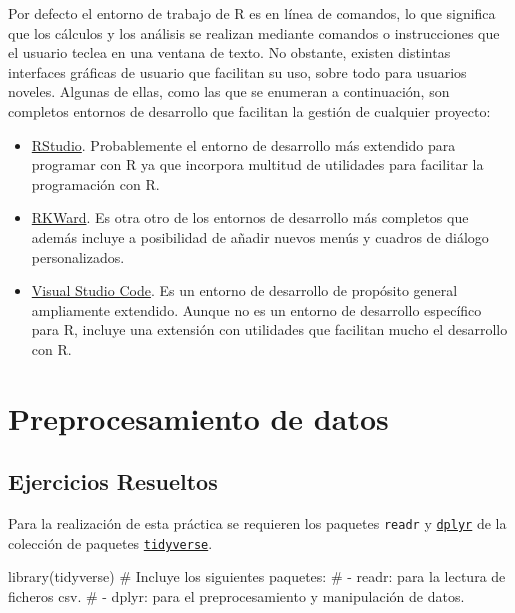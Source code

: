 \documentclass[
  a4paper,
]{scrreport}
\newenvironment{Shaded}{\begin{snugshade}}{\end{snugshade}}
\newcommand{\CommentTok}[1]{\textcolor[rgb]{0.37,0.37,0.37}{#1}}
\newcommand{\FunctionTok}[1]{\textcolor[rgb]{0.28,0.35,0.67}{#1}}
\newcommand{\NormalTok}[1]{\textcolor[rgb]{0.00,0.23,0.31}{#1}}
\theoremstyle{definition}
\theoremstyle{remark}
\begin{document}
Por defecto el entorno de trabajo de R es en línea de comandos, lo que
significa que los cálculos y los análisis se realizan mediante comandos
o instrucciones que el usuario teclea en una ventana de texto. No
obstante, existen distintas interfaces gráficas de usuario que facilitan
su uso, sobre todo para usuarios noveles. Algunas de ellas, como las que
se enumeran a continuación, son completos entornos de desarrollo que
facilitan la gestión de cualquier proyecto:

\begin{itemize}
\item
  \href{https://www.rstudio.com/}{RStudio}. Probablemente el entorno de
  desarrollo más extendido para programar con R ya que incorpora
  multitud de utilidades para facilitar la programación con R.
\item
  \href{https://rkward.kde.org}{RKWard}. Es otra otro de los entornos de
  desarrollo más completos que además incluye a posibilidad de añadir
  nuevos menús y cuadros de diálogo personalizados.
\item
  \href{https://code.visualstudio.com/}{Visual Studio Code}. Es un
  entorno de desarrollo de propósito general ampliamente extendido.
  Aunque no es un entorno de desarrollo específico para R, incluye una
  extensión con utilidades que facilitan mucho el desarrollo con R.
\end{itemize}


\chapter{Preprocesamiento de datos}\label{preprocesamiento-de-datos}

\section{Ejercicios Resueltos}\label{ejercicios-resueltos}

Para la realización de esta práctica se requieren los paquetes
\texttt{readr} y
\href{https://aprendeconalf.es/manual-r/06-preprocesamiento.html\#el-paquete-dplyr}{\texttt{dplyr}}
de la colección de paquetes
\href{https://aprendeconalf.es/manual-r/06-preprocesamiento.html\#la-colecci\%C3\%B3n-de-paquetes-tidyverse}{\texttt{tidyverse}}.

\begin{Shaded}
\begin{Highlighting}[]
\FunctionTok{library}\NormalTok{(tidyverse) }
\CommentTok{\# Incluye los siguientes paquetes:}
\CommentTok{\# {-} readr: para la lectura de ficheros csv. }
\CommentTok{\# {-} dplyr: para el preprocesamiento y manipulación de datos.}
\end{Highlighting}
\end{Shaded}
\end{document}
